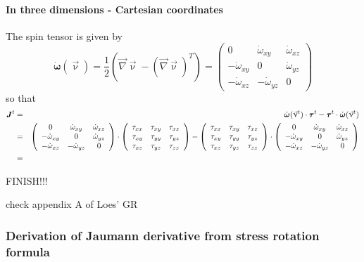 \paragraph{In three dimensions - Cartesian coordinates}
The spin tensor is given by 
\[
\dot{\bm \omega}(\vec\upnu) 
= \frac{1}{2}\left( \vec\nabla\vec \upnu - (\vec\nabla \vec\upnu)^T \right)
= 
\left( \begin{array}{ccc}
0 & \dot{\omega}_{xy} & \dot{\omega}_{xz}\\
-\dot{\omega}_{xy} & 0 & \dot{\omega}_{yz} \\
-\dot{\omega}_{xz} & -\dot{\omega}_{yz} & 0
\end{array}\right)
\]
so that 
\begin{eqnarray}
{\bm J}^t 
&=& \dot{\bm \omega}(\vec\upnu^t) \cdot {\bm \tau}^t - {\bm \tau}^t \cdot \dot{\bm \omega}(\vec\upnu^t)  \nonumber\\
&=&
\left( \begin{array}{ccc}
0 & \dot{\omega}_{xy} & \dot{\omega}_{xz}\\
-\dot{\omega}_{xy} & 0 & \dot{\omega}_{yz} \\
-\dot{\omega}_{xz} & -\dot{\omega}_{yz} & 0
\end{array}\right)
\cdot
\left( \begin{array}{ccc}
\tau_{xx} & \tau_{xy} & \tau_{xz}\\
\tau_{xy} & \tau_{yy} & \tau_{yz}\\
\tau_{xz} & \tau_{yz} & \tau_{zz}
\end{array}\right)
-
\left( \begin{array}{ccc}
\tau_{xx} & \tau_{xy} & \tau_{xz}\\
\tau_{xy} & \tau_{yy} & \tau_{yz}\\
\tau_{xz} & \tau_{yz} & \tau_{zz}
\end{array}\right)
\cdot
\left( \begin{array}{ccc}
0 & \dot{\omega}_{xy} & \dot{\omega}_{xz}\\
-\dot{\omega}_{xy} & 0 & \dot{\omega}_{yz} \\
-\dot{\omega}_{xz} & -\dot{\omega}_{yz} & 0
\end{array}\right)
\nonumber\\
&=&
\end{eqnarray}

FINISH!!!


check appendix A of Loes' GR

\newpage
\subsubsection{Derivation of Jaumann derivative from stress rotation formula}

